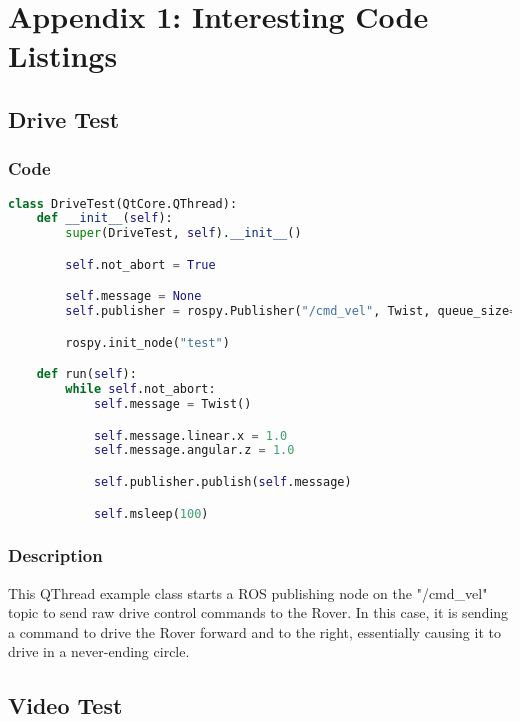 \section{Appendix 1: Interesting Code Listings}
\subsection{Drive Test}
\subsubsection{Code}
\begin{lstlisting}[language=python]
class DriveTest(QtCore.QThread):
    def __init__(self):
        super(DriveTest, self).__init__()

        self.not_abort = True

        self.message = None
        self.publisher = rospy.Publisher("/cmd_vel", Twist, queue_size=10)

        rospy.init_node("test")

    def run(self):
        while self.not_abort:
            self.message = Twist()

            self.message.linear.x = 1.0
            self.message.angular.z = 1.0

            self.publisher.publish(self.message)

            self.msleep(100)
\end{lstlisting}

\subsubsection{Description}
This QThread example class starts a ROS publishing node on the "/cmd\_vel" topic to send raw drive control commands to the Rover.
In this case, it is sending a command to drive the Rover forward and to the right, essentially causing it to drive in a never-ending circle.

\subsection{Video Test}
